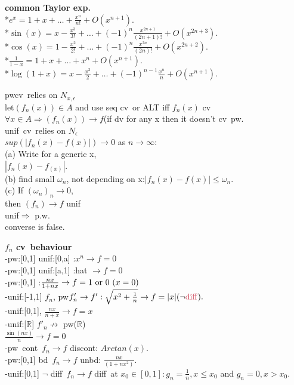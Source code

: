 \documentclass[10pt,landscape,a4paper]{article}
\def\line{

  \noindent{\color{mygray} \rule{\linewidth}{0.005mm}}

}
\def\R{\mathbb{R}}
\def \bd{\textcolor{burgundy}{bd}}
\def\cv{\textcolor{emerald}{cv}}
\def\unif{\textcolor{antiquefuchsia}{unif}}
\def\pw{\textcolor{bluegray}{pw}}
\def\diff{\textcolor{brickred}{diff}}
\def\cont{\textcolor{brickred}{cont}}
\newcommand\hint[1]{\textcolor{trolleygrey}{\bf#1}}
\newcommand\greenbox[1]{\line\textcolor{ferngreen}{\bf#1}}
\begin{document}
\begin{multicols}{8}
\greenbox{common Taylor exp.}\\
*$e^x=1+x+\hdots+\frac{x^n}{n!}+O(x^{n+1})$.\\
*$\sin(x)=x-\frac{x^3}{3!}+\hdots+(-1)^{n}\frac{x^{2n+1}}{(2n+1)!}+O(x^{2n+3}).$\\
*$\cos(x)=1-\frac{x^2}{2!}+\hdots+(-1)^{n}\frac{x^{2n}}{(2n)!}+O(x^{2n+2}).$\\
*$\frac{1}{1-x} = 1 +x +\hdots+ x^n+O(x^{n+1}).$\\
*$\log(1+x) = x-\frac{x^2}{2}+\hdots+(-1)^{n-1}\frac{x^n}{n}+O(x^{n+1}).$

\line
\textcolor{ferngreen}{\pw \cv\ relies on $N_{x,\epsilon}$}
\\let$(f_n(x)) \in A$ and use seq \cv\, or ALT 
iff $f_n(x)$ \cv\ $\forall x \in A \Rightarrow (f_n(x))\to f$(if dv for any x then it doesn't \cv\ \pw.
\\\textcolor{ferngreen}{\unif\ \cv\ relies on $N_\epsilon$\\}
$sup(|f_n(x) - f(x)|)\to 0$ as $n \to \infty$:\\
(a) Write for a generic x,\\ $|f_n (x) - f_(x)|$.\\
(b) find small $\omega_n$, not depending on x:$|f_n(x)-f(x)| \leq \omega_n$.\\
(c) If $(\omega_n)_n \to 0$, \\then $(f_n)\to f$ \unif\
\\\textcolor{ferngreen}{\unif$\Rightarrow$ p.w.\\ converse is false.}
\line
\hint{$f_n$ \cv\ behaviour}\\
-\pw:[0,1] \unif:[0,a] :$x^n \to f = 0$\\
-\pw:[0,1] \unif:[a,1] :hat $\to f = 0$\\
-\pw:[0,1] :$\frac{nx}{1+nx} \\ \to f = 1\ \mathrm{or}\ 0\ (x = 0)$\\
-\unif:[-1,1] $f_n$, \pw $f'_n \to f': \sqrt{x^2 + \frac{1}{n}} \to f = |x|(\neg \mathrm{\diff}).$\\
-\unif:[0,1], $\frac{nx}{n+x} \to f = x$\\
-\unif:[$\R$] $f'_n\nrightarrow$ \pw($\R$)\\
$\frac{\sin(nx)}{n} \to f = 0$\\
-\pw\ \cont\ $f_n \to f$ discont: $Arctan(x).$\\
-\pw:[0,1] \bd\ $f_n \to f$ unbd: $\frac{nx}{(1+nx^2)}.$\\
-\unif:[0,1] $\neg$ \diff\ $f_n \to f$ \diff\ at $x_0 \in [0,1]:
g_n = \frac{1}{n}, x \leq x_0$ and $g_n = 0, x>x_0$.


\end{multicols}
\end{document}
